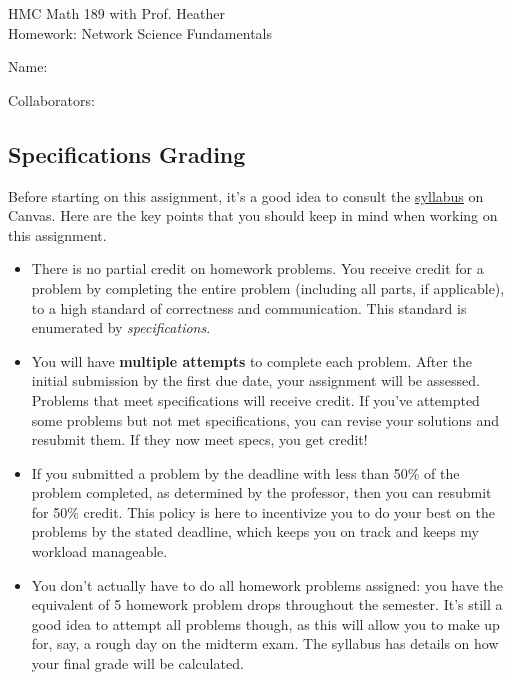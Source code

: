 \documentclass[11pt]{article}
\begin{document}
\begin{titlepage}

HMC Math 189 with Prof. Heather\\ 
Homework: Network Science Fundamentals

\bigskip

Name:

\bigskip
Collaborators: 

\subsection*{Specifications Grading}

Before starting on this assignment, it's a good idea to consult the \href{https://harveymuddcollege.instructure.com/courses/1418/assignments/syllabus}{syllabus} on Canvas. 
Here are the key points that you should keep in mind when working on this assignment.
\begin{itemize}
    \item There is no partial credit on homework problems. You receive credit for a problem by completing the entire problem (including all parts, if applicable), to a high standard of correctness and communication. 
    This standard is enumerated by \emph{specifications}. 
    \item You will have \textbf{multiple attempts} to complete each problem. 
    After the initial submission by the first due date, your assignment will be assessed. 
    Problems that meet specifications will receive credit. 
    If you've attempted some problems but not met specifications, you can revise your solutions and resubmit them. 
    If they now meet specs, you get credit! 
    \item If you submitted a problem by the deadline with less than 50\% of the problem completed, as determined by the professor, then you can resubmit for 50\% credit. 
    This policy is here to incentivize you to do your best on the problems by the stated deadline, which keeps you on track and keeps my workload manageable. 
    \item You don't actually have to do all homework problems assigned: you have the equivalent of 5 homework problem drops throughout the semester. 
    It's still a good idea to attempt all problems though, as this will allow you to make up for, say, a rough day on the midterm exam. 
    The syllabus has details on how your final grade will be calculated. 
\end{itemize}

\pagebreak


\end{titlepage}
\end{document}
